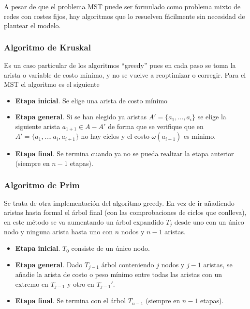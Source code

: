 \vspace*{2mm}

A pesar de que el problema MST puede ser formulado como problema mixto de redes con costes fijos, hay algoritmos que lo
resuelven fácilmente sin necesidad de plantear el modelo.

\newpage

\subsubsection{Algoritmo de Kruskal}

Es un caso particular de los algoritmos ``greedy'' pues en cada paso se toma la arista o variable de costo mínimo, y no se
vuelve a reoptimizar o corregir. Para el MST el algoritmo es el siguiente

\begin{itemize}
    \item \textbf{Etapa inicial}. Se elige una arista de costo mínimo
    \item \textbf{Etapa general}. Si se han elegido ya aristas $A'=\{a_1,\dots,a_i\}$ se elige la siguiente arista 
    $a_{1+1}\in A-A'$ de forma que se verifique que en $A'=\{a_1,\dots,a_i,a_{i+1}\}$ no hay ciclos y el costo 
    $\omega(a_{i+1})$ es mínimo.
    \item \textbf{Etapa final}. Se termina cuando ya no se pueda realizar la etapa anterior (siempre en $n-1$ etapas).
\end{itemize}

\subsubsection{Algoritmo de Prim}

Se trata de otra implementación del algoritmo greedy. En vez de ir añadiendo aristas hasta formal el árbol final (con las 
comprobaciones de ciclos que conlleva), en este método se va aumentando un árbol expandido $T_j$ desde uno con un único nodo y
ninguna arista hasta uno con $n$ nodos y $n-1$ aristas.

\begin{itemize}
    \item \textbf{Etapa inicial}. $T_0$ consiste de un único nodo.
    \item \textbf{Etapa general}. Dado $T_{j-1}$ árbol conteniendo $j$ nodos y $j-1$ aristas, se añadie la arista de costo o
    peso mínimo entre todas las aristas con un extremo en $T_{j-1}$ y otro en $T_{j-1}'$.
    \item \textbf{Etapa final}. Se termina con el árbol $T_{n-1}$ (siempre en $n-1$ etapas).
\end{itemize}

